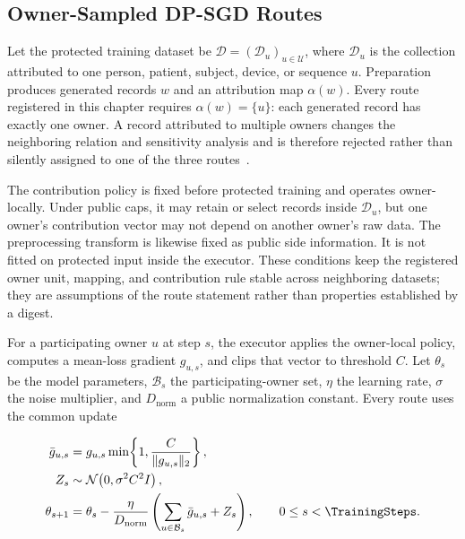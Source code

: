 \subsection{Owner-Sampled DP-SGD Routes}
\label{subsec:ch3-owner-routes}

Let the protected training dataset be
\(\mathcal D=(\mathcal D_u)_{u\in\mathcal U}\), where
\(\mathcal D_u\) is the collection attributed to one person, patient, subject,
device, or sequence \(u\).  Preparation produces generated records \(w\) and an
attribution map \(\alpha(w)\).  Every route registered in this chapter requires
\(\alpha(w)=\{u\}\): each generated record has exactly one owner.  A record
attributed to multiple owners changes the neighboring relation and sensitivity
analysis and is therefore rejected rather than silently assigned to one of the
three routes~\cite{ganesh2025multiuser}.

The contribution policy is fixed before protected training and operates
owner-locally.  Under public caps, it may retain or select records inside
\(\mathcal D_u\), but one owner's contribution vector may not depend on another
owner's raw data.  The preprocessing transform is likewise fixed as public side
information.  It is not fitted on protected input inside the executor.  These
conditions keep the registered owner unit, mapping, and contribution rule stable
across neighboring datasets; they are assumptions of the route statement rather
than properties established by a digest.

For a participating owner \(u\) at step \(s\), the executor applies the
owner-local policy, computes a mean-loss gradient \(g_{u,s}\), and clips that
vector to threshold \(C\).  Let \(\theta_s\) be the model parameters,
\(\mathcal B_s\) the participating-owner set, \(\eta\) the learning rate,
\(\sigma\) the noise multiplier, and \(D_{\mathrm{norm}}\) a public normalization
constant.  Every route uses the common update

\begin{equation}
\begin{aligned}
    \bar g_{u,s}
        &=
        g_{u,s}
        \min\!\left\{1,\frac{C}{\lVert g_{u,s}\rVert_2}\right\},\\
    Z_s
        &\sim
        \mathcal N\!\left(0,\sigma^2 C^2 I\right),\\
    \theta_{s+1}
        &=
        \theta_s
        -
        \frac{\eta}{D_{\mathrm{norm}}}
        \left(
            \sum_{u\in\mathcal B_s}\bar g_{u,s}+Z_s
        \right),
        \qquad
        0\leq s<\TrainingSteps .
\end{aligned}
\label{eq:ch3-common-update}
\end{equation}

